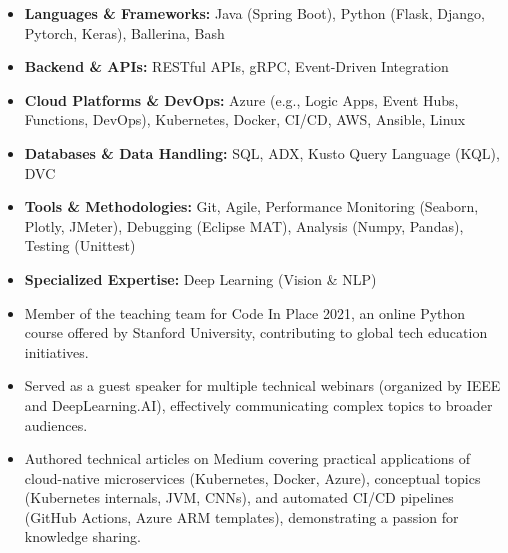 \documentclass[12pt,a4paper,withhyper]{altacv}
\begin{document}
\medskip



\medskip

\begin{itemize}
    \item \textbf{Languages \& Frameworks:} Java (Spring Boot), Python (Flask, Django, Pytorch, Keras), Ballerina, Bash
    \item \textbf{Backend \& APIs:} RESTful APIs, gRPC, Event-Driven Integration
    \item \textbf{Cloud Platforms \& DevOps:} Azure (e.g., Logic Apps, Event Hubs, Functions, DevOps), Kubernetes, Docker, CI/CD, AWS, Ansible, Linux
    \item \textbf{Databases \& Data Handling:} SQL, ADX, Kusto Query Language (KQL), DVC
    \item \textbf{Tools \& Methodologies:} Git, Agile, Performance Monitoring (Seaborn, Plotly, JMeter), Debugging (Eclipse MAT), Analysis (Numpy, Pandas), Testing (Unittest)
    \item \textbf{Specialized Expertise:} Deep Learning (Vision \& NLP)
\end{itemize}

\medskip

\begin{itemize}
    \item Member of the teaching team for Code In Place 2021, an online Python course offered by Stanford University, contributing to global tech education initiatives.
    \item Served as a guest speaker for multiple technical webinars (organized by IEEE and DeepLearning.AI), effectively communicating complex topics to broader audiences.
    \item  Authored technical articles on Medium covering practical applications of cloud-native microservices (Kubernetes, Docker, Azure), conceptual topics (Kubernetes internals, JVM, CNNs), and automated CI/CD pipelines (GitHub Actions, Azure ARM templates), demonstrating a passion for knowledge sharing.
\end{itemize}
\end{document}
